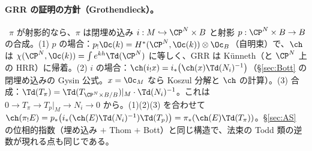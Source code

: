\paragraph{GRR の証明の方針（Grothendieck）。}\tC\ $\pi$ が射影的なら、$\pi$ は閉埋め込み $i:M\hookrightarrow\CP^N\times B$ と射影 $p:\CP^N\times B\to B$ の合成。(1) $p$ の場合：$p_!\Oc(k)=H^*(\CP^N,\Oc(k))\otimes\Oc_B$（自明束）で、$\ch$ は $\chi(\CP^N,\Oc(k))=\int e^{kh}\Td(\CP^N)$ に等しく、GRR は Künneth（と $\CP^N$ 上の HRR）に帰着。(2) $i$ の場合：$\ch(i_!x)=i_*\bigl(\ch(x)\Td(N_i)^{-1}\bigr)$（\S\ref{sec:Bott} の閉埋め込みの Gysin 公式。$x=\Oc_M$ なら Koszul 分解と $\ch$ の計算）。(3) 合成：$\Td(T_\pi)=\Td(T_{\CP^N\times B/B})|_M\cdot\Td(N_i)^{-1}$。これは $0\to T_\pi\to T_{p}|_M\to N_i\to0$ から。(1)(2)(3) を合わせて $\ch(\pi_!E)=p_*\bigl(i_*(\ch(E)\Td(N_i)^{-1})\Td(T_p)\bigr)=\pi_*(\ch(E)\Td(T_\pi))$。\S\ref{sec:AS} の位相的指数（埋め込み $+$ Thom $+$ Bott）と同じ構造で、法束の Todd 類の逆数が現れる点も同じである。

